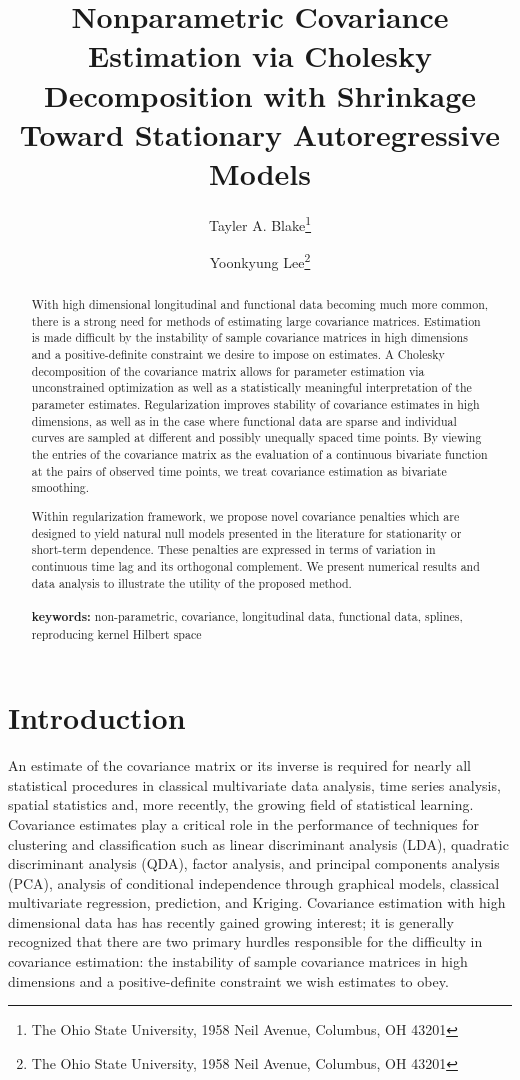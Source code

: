 \documentclass[12pt]{article}
\title{ Nonparametric Covariance Estimation via Cholesky Decomposition with Shrinkage Toward Stationary Autoregressive Models}
\author{Tayler A. Blake\thanks{The Ohio State University, 1958 Neil Avenue, Columbus, OH 43201} \and  Yoonkyung Lee\thanks{The Ohio State University, 1958 Neil Avenue, Columbus, OH 43201}}
\begin{document}

\maketitle

\begin{abstract}
With high dimensional longitudinal and functional data becoming much more common, there is a strong need for methods of estimating large covariance matrices. Estimation is made difficult  by the instability of sample covariance matrices in high dimensions and a positive-definite constraint we desire to impose on estimates. A Cholesky decomposition of the covariance matrix allows for parameter estimation via unconstrained optimization as well as a statistically meaningful interpretation of the parameter estimates. Regularization improves stability of covariance estimates in high dimensions, as well as in the case where functional data are sparse and individual curves are sampled at different and possibly unequally spaced time points. By viewing the entries of the covariance matrix as the evaluation of a continuous bivariate function at the pairs of observed time points, we treat covariance estimation as bivariate smoothing. 

Within regularization framework, we propose novel covariance penalties which are designed to yield natural null models presented in the literature for stationarity or short-term dependence. These penalties are expressed in terms of variation in continuous time lag and its orthogonal complement. We present numerical results and data analysis to illustrate the utility of the proposed method. \\
\\
{\bf keywords:} non-parametric, covariance, longitudinal data, functional data, splines, reproducing kernel Hilbert space
\end{abstract}


\section{Introduction}

\indent

An estimate of the covariance matrix or its inverse is required for nearly all statistical procedures in classical multivariate data analysis, time series analysis, spatial statistics and, more recently, the growing field of statistical learning. Covariance estimates play a critical role in the performance of techniques for clustering and classification such as linear discriminant analysis (LDA), quadratic discriminant analysis (QDA), factor analysis, and principal components analysis (PCA), analysis of conditional independence through graphical models, classical multivariate regression, prediction, and Kriging. Covariance estimation with high dimensional data has has recently gained growing interest; it is generally recognized that there are two primary hurdles responsible for the difficulty in covariance estimation: the instability of sample covariance matrices in high dimensions and a positive-definite constraint we wish estimates to obey.
\end{document}
